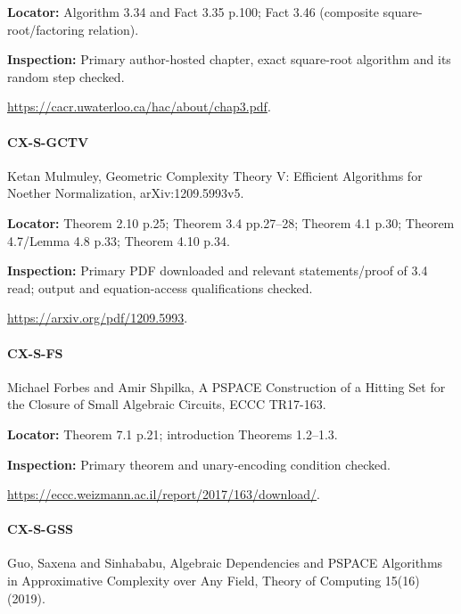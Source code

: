 \documentclass[11pt,a4paper]{article}
\begin{document}
\textbf{Locator:} Algorithm 3.\allowbreak{}34 and Fact 3.\allowbreak{}35 p.\allowbreak{}100; Fact 3.\allowbreak{}46 (composite square-root/\allowbreak{}factoring relation).

\textbf{Inspection:} Primary author-hosted chapter, exact square-root algorithm and its random step checked.\allowbreak{}

\url{https://cacr.uwaterloo.ca/hac/about/chap3.pdf}.

\paragraph{CX-S-GCTV} Ketan Mulmuley, Geometric Complexity Theory V:\allowbreak{} Efficient Algorithms for Noether Normalization, arXiv:\allowbreak{}1209.\allowbreak{}5993v5.

\textbf{Locator:} Theorem 2.\allowbreak{}10 p.\allowbreak{}25; Theorem 3.\allowbreak{}4 pp.\allowbreak{}27–\allowbreak{}28; Theorem 4.\allowbreak{}1 p.\allowbreak{}30; Theorem 4.\allowbreak{}7/\allowbreak{}Lemma 4.\allowbreak{}8 p.\allowbreak{}33; Theorem 4.\allowbreak{}10 p.\allowbreak{}34.

\textbf{Inspection:} Primary PDF downloaded and relevant statements/\allowbreak{}proof of 3.\allowbreak{}4 read; output and equation-access qualifications checked.\allowbreak{}

\url{https://arxiv.org/pdf/1209.5993}.

\paragraph{CX-S-FS} Michael Forbes and Amir Shpilka, A PSPACE Construction of a Hitting Set for the Closure of Small Algebraic Circuits, ECCC TR17-163.

\textbf{Locator:} Theorem 7.\allowbreak{}1 p.\allowbreak{}21; introduction Theorems 1.\allowbreak{}2–\allowbreak{}1.\allowbreak{}3.

\textbf{Inspection:} Primary theorem and unary-encoding condition checked.\allowbreak{}

\url{https://eccc.weizmann.ac.il/report/2017/163/download/}.

\paragraph{CX-S-GSS} Guo, Saxena and Sinhababu, Algebraic Dependencies and PSPACE Algorithms in Approximative Complexity over Any Field, Theory of Computing 15(16) (2019).
\end{document}
